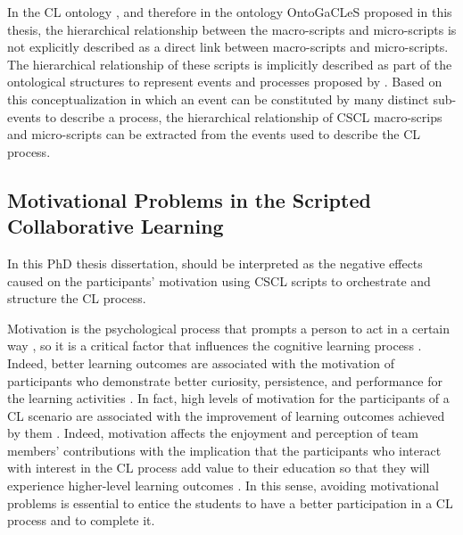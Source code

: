 In the CL ontology \cite{IsotaniInabaIkedaMizoguchi2009}, and therefore in the ontology OntoGaCLeS proposed in this thesis, the hierarchical relationship between the macro-scripts and micro-scripts is not explicitly described as a direct link between macro-scripts and micro-scripts.
The hierarchical relationship of these scripts is implicitly described as part of the ontological structures to represent events and processes proposed by .
Based on this conceptualization in which an event can be constituted by many distinct sub-events to describe a process, the hierarchical relationship of CSCL macro-scrips and micro-scripts can be extracted from the events used to describe the CL process.

\subsection{Motivational Problems in the Scripted Collaborative Learning}
\label{subsec:motivation-problem}

In this PhD thesis dissertation,  should be interpreted as the negative effects caused on the participants' motivation using CSCL scripts to orchestrate and structure the CL process.

Motivation is the psychological process that prompts a person to act in a certain way \cite{MitchellDaniels2003}, so it is a critical factor that influences the cognitive learning process \cite{DeciRyan1985}.
Indeed, better learning outcomes are associated with the motivation of participants who demonstrate better curiosity, persistence, and performance for the learning activities \cite{DeciRyan1985,Serrano-CamaraParedes-VelascoAlcoverVelazquez-Iturbide2014}.
In fact, high levels of motivation for the participants of a CL scenario are associated with the improvement of learning outcomes achieved by them \cite{SerranoCamaraParedesVelascoVelazquez-Iturbide2012,Serrano-CamaraParedes-VelascoAlcoverVelazquez-Iturbide2014}.
Indeed, motivation affects the enjoyment and perception of team members' contributions with the implication that the participants who interact with interest in the CL process add value to their education so that they will experience higher-level learning outcomes \cite{GomezWuPasserini2010}.
In this sense, avoiding motivational problems is essential to entice the students to have a better participation in a CL process and to complete it.

